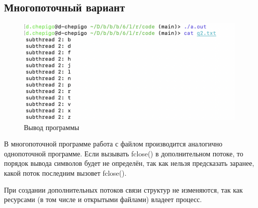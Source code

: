 \newpage

\subsection{Многопоточный вариант}

\clearpage

\begin{figure}[h]
	\centering
	\includegraphics[width=\textwidth]{image/22-2}
	\caption{Вывод программы}
\end{figure}

В многопоточной программе работа с файлом производится аналогично однопоточной программе. Если вызывать fclose() в дополнительном потоке, то порядок вывода символов будет не определён, так как нельзя предсказать заранее, какой поток последним вызовет fclose().

При создании дополнительных потоков связи структур не изменяются, так как ресурсами (в том числе и открытыми файлами) владеет процесс.
